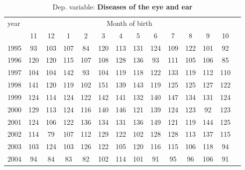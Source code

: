 \begin{table}[H] \begin{threeparttable} \centering \caption{Dep. variable: \textbf{Diseases of the eye and ear}} {\def\sym#1{\ifmmode^{#1}\else\(^{#1}\)\fi} \begin{tabular}{l*{13}{c}} \toprule year & \multicolumn{12}{c}{Month of birth} \\ \cmidrule(lr){2-13} 
            &          11&          12&           1&           2&           3&           4&           5&           6&           7&           8&           9&          10\\
1995        &          93&         103&         107&          84&         120&         113&         131&         124&         109&         122&         101&          92\\
1996        &         120&         120&         115&         107&         108&         128&         136&          93&         111&         105&         106&          85\\
1997        &         104&         104&         142&          93&         104&         119&         118&         122&         133&         119&         112&         110\\
1998        &         141&         120&         119&         102&         151&         139&         143&         119&         125&         125&         127&         122\\
1999        &         124&         114&         124&         122&         142&         141&         132&         140&         147&         134&         131&         124\\
2000        &         129&         113&         124&         116&         140&         146&         121&         139&         124&         123&          92&         123\\
2001        &         124&         106&         122&         136&         134&         131&         136&         149&         121&         119&         144&         125\\
2002        &         114&          79&         107&         112&         129&         122&         102&         128&         128&         113&         137&         115\\
2003        &         103&         124&         103&         126&         122&         105&         120&         116&         115&         106&         118&          94\\
2004        &          94&          84&          83&          82&         102&         114&         101&          91&          95&          96&         106&          91\\

\end{tabular}}
\end{threeparttable}
\end{table}
